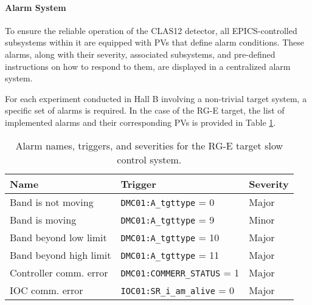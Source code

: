 \paragraph{Alarm System}
    To ensure the reliable operation of the CLAS12 detector, all EPICS-controlled subsystems within it are equipped with PVs that define alarm conditions.
    These alarms, along with their severity, associated subsystems, and pre-defined instructions on how to respond to them, are displayed in a centralized alarm system.

    For each experiment conducted in Hall B involving a non-trivial target system, a specific set of alarms is required.
    In the case of the RG-E target, the list of implemented alarms and their corresponding PVs is provided in Table \ref{tab::alarmspv}.

    \begin{table}[b!]
        \caption{Alarm names, triggers, and severities for the RG-E target slow control system.}

        \begin{center}
            \begin{tabularx}{360pt}{llX}
                \hline
                \textbf{Name}          & \textbf{Trigger}                     & \textbf{Severity} \\
                \hline
                Band is not moving     & \texttt{DMC01:A\_tgttype}       =  0 & Major             \\
                Band is moving         & \texttt{DMC01:A\_tgttype}       =  9 & Minor             \\
                Band beyond low limit  & \texttt{DMC01:A\_tgttype}       = 10 & Major             \\
                Band beyond high limit & \texttt{DMC01:A\_tgttype}       = 11 & Major             \\
                Controller comm. error & \texttt{DMC01:COMMERR\_STATUS}  =  1 & Major             \\
                IOC comm. error        & \texttt{IOC01:SR\_i\_am\_alive} =  0 & Major             \\
                \hline
            \end{tabularx}
            \label{tab::alarmspv}
        \end{center}
    \end{table}
